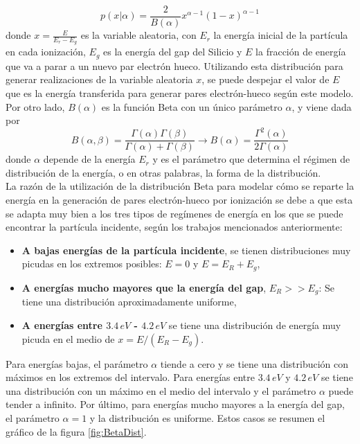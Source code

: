 \begin{equation*}
    p(x|\alpha) = \frac{2}{B(\alpha)} x^{\alpha - 1}(1-x)^{\alpha - 1}
\end{equation*}
donde $x = \frac{E}{E_{r} - E_{g}}$ es la variable aleatoria, con $E_{r}$ la energía inicial de la partícula en cada ionización, $E_{g}$ es la energía del gap del Silicio y $E$ la fracción de energía que va a parar a un nuevo par electrón hueco. Utilizando esta distribución para generar realizaciones de la variable aleatoria $x$, se puede despejar el valor de $E$ que es la energía transferida para generar pares electrón-hueco según este modelo. Por otro lado, $B(\alpha)$ es la función Beta con un único parámetro $\alpha$, y viene dada por
\begin{equation*}
    B(\alpha, \beta) 
    = \frac{\Gamma(\alpha)\Gamma(\beta)}{\Gamma(\alpha) + \Gamma(\beta)}
    \longrightarrow
    B(\alpha)
    = \frac{\Gamma^{2}(\alpha)}{2\Gamma(\alpha)}
\end{equation*}
donde $\alpha$ depende de la energía $E_{r}$ y es el parámetro que determina el régimen de distribución de la energía, o en otras palabras, la forma de la distribución.\\
\indent La razón de la utilización de la distribución Beta para modelar cómo se reparte la energía en la generación de pares electrón-hueco por ionización se debe a que esta se adapta muy bien a los tres tipos de regímenes de energía en los que se puede encontrar la partícula incidente, según los trabajos mencionados anteriormente:
\begin{itemize}
    \item \textbf{A bajas energías de la partícula incidente}, se tienen distribuciones muy picudas en los extremos posibles: $E = 0$ y $E = E_{R}+E_{g}$,
    \item \textbf{A energías mucho mayores que la energía del gap}, $E_{R} >> E_{g}$: Se tiene una distribución aproximadamente uniforme,
    \item \textbf{A energías entre $3.4\,\si{eV}$ - $4.2\,\si{eV}$} se tiene una distribución de energía muy picuda en el medio de $x = E/(E_{R} - E_{g})$.
\end{itemize}
Para energías bajas, el parámetro $\alpha$ tiende a cero y se tiene una distribución con máximos en los extremos del intervalo. Para energías entre $3.4\,\si{eV}$ y $4.2\,\si{eV}$ se tiene una distribución con un máximo en el medio del intervalo y el parámetro $\alpha$ puede tender a infinito. Por último, para energías mucho mayores a la energía del gap, el parámetro $\alpha = 1$ y la distribución es uniforme. Estos casos se resumen el gráfico de la figura \ref{fig:BetaDist}.

